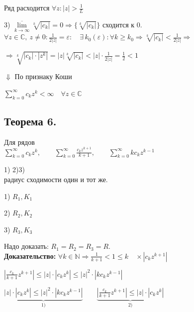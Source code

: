 \documentclass[a4paper,12pt]{article} %
\begin{document}
 Ряд расходится $\forall z: |z| > \frac{1}{L}$

 3) $\overline{\lim\limits_{k \to \infty} }\sqrt[k]{|c_k|} = 0 \Rightarrow \{ \sqrt[k]{|c_k|}\}$ сходится к 0.\\

 $\forall z \in \mathbb{C}, \   z \neq 0 : \frac{1}{2|z|} = \varepsilon: \quad  \exists \, k_0(\varepsilon) : \forall k \geqslant k_0 \Rightarrow \sqrt[k]{|c_k|} < \frac{1}{2|z|} \Rightarrow$

 $\Rightarrow \sqrt[k]{|c_k|\cdot |z^k|} = |z|\sqrt[k]{|c_k|} < |z| \cdot \frac{1}{2|z|} = \frac{1}{2} < 1$ 
 
 \hspace*{1 cm} $\Downarrow$ По признаку Коши
 
 $\sum\limits_{k = 0}^\infty c_k z^k  < \infty \quad \forall z \in \mathbb{C}$
 
  \subsection{Теорема 6.}
  Для рядов \\

  $\sum\limits_{k = 0}^\infty c_k z^k, \quad \quad \sum\limits_{k = 0}^\infty \frac{c_k z^{k + 1}}{k + 1}, \quad \quad \sum\limits_{k = 0}^\infty k c_k z^{k - 1} \quad$
  
   \hspace*{0.5 cm}1) \hspace*{2.4 cm}2)\hspace*{2.7 cm}3)\\

    радиус сходимости один и тот же.
    
    1) $R_1, K_1$
    
    2) $R_2, K_2$
    
    3) $R_3, K_3$
    
    Надо доказать: $R_1 = R_2 = R_3 = R$.\\

    \textbf{Доказательство:}
    $\forall k \in \mathbb{N} \Rightarrow \frac{1}{k + 1} < 1 \leqslant k \quad  \times |c_k z^{k + 1}|$
    
    $|\frac{c_k}{k + 1} z^{k + 1}| \leqslant |z| \cdot |c_k z^k| \leqslant |z|^2 \cdot |k c_k z^{k - 1}|$

    $\underbrace{ |z| \cdot |c_k z^k| \leqslant |z|^2 \cdot |k c_k z^{k - 1}|}_{1)} \quad \quad \underbrace{|\frac{c_k}{k + 1} z^{k + 1}| \leqslant |z| \cdot |c_k z^k|}_{2)}$
    
\end{document}
